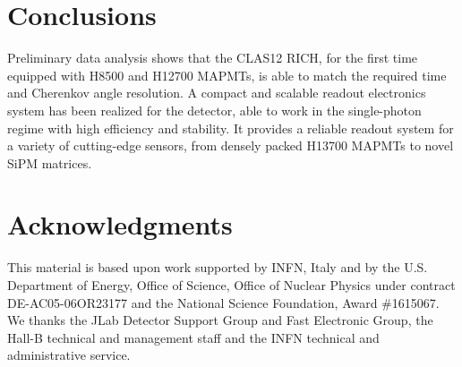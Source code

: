 \documentclass[final,5p,times,twocolumn]{elsarticle}
\begin{document}
\section{Conclusions}

Preliminary data analysis shows that the CLAS12 RICH,
for the first time equipped with H8500 and H12700 MAPMTs, is able to match the required time and Cherenkov angle resolution.
A compact and scalable readout electronics system has been realized for the detector, able to work in 
the single-photon regime with high efficiency and stability. 
It provides a reliable readout system for a variety of cutting-edge sensors, from densely packed H13700 MAPMTs
to novel SiPM matrices. 

\section{Acknowledgments}

This material is based upon work supported by INFN, Italy and by the U.S. Department of Energy, Office of Science, Office
of Nuclear Physics under contract DE-AC05-06OR23177 and the National Science Foundation, Award \#1615067. We thanks the JLab Detector Support
Group and Fast Electronic Group, the Hall-B technical and management staff and the INFN technical and administrative
service.
\end{document}
